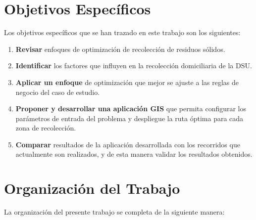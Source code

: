 \section{Objetivos Específicos}

Los objetivos específicos que se han trazado en este trabajo son los siguientes:

\begin{enumerate}
    \item \textbf{Revisar} enfoques de optimización de recolección de residuos sólidos.
    \item \textbf{Identificar} los factores que influyen en la recolección domiciliaria de la DSU.
    \item \textbf{Aplicar un enfoque} de optimización que mejor se ajuste a las reglas de negocio del caso de estudio.
    \item \textbf{Proponer y desarrollar una aplicación GIS} que permita configurar los parámetros de entrada del problema y despliegue la ruta óptima para cada zona de recolección.
    \item \textbf{Comparar} resultados de la aplicación desarrollada con los recorridos que actualmente son realizados, y de esta manera validar los resultados obtenidos.
\end{enumerate}

\section{Organización del Trabajo}

La organización del presente trabajo se completa de la siguiente manera:

